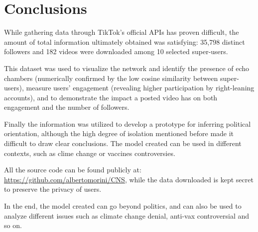 \section{Conclusions}

While gathering data through TikTok's official APIs has proven difficult, the amount of total information ultimately obtained was satisfying: 35,798 distinct followers and 182 videos were downloaded among 10 selected super-users.

This dataset was used to visualize the network and identify the presence of echo chambers (numerically confirmed by the low cosine similarity between super-users), measure users' engagement (revealing higher participation by right-leaning accounts), and to demonstrate the impact a posted video has on both engagement and the number of followers.

Finally the information was utilized to develop a prototype for inferring political orientation, although the high degree of isolation mentioned before made it difficult to draw clear conclusions. 
The model created can be used in different contexts, such as clime change or vaccines controversies.

All the source code can be found publicly at: \url{https://github.com/albertomorini/CNS}, while the data downloaded is kept secret to preserve the privacy of users.

In the end, the model created can go beyond politics, and can also be used to analyze different issues such as climate change denial, anti-vax controversial and so on.